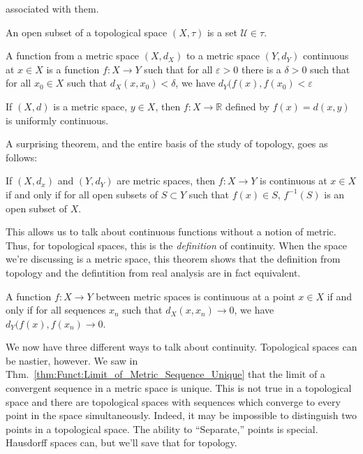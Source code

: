 \documentclass[crop=false,class=book,oneside]{standalone}
\begin{document}
            associated with them.
            \begin{definition}
                An open subset of a topological space
                $(X,\tau)$ is a set $\mathcal{U}\in\tau$.
            \end{definition}
            \begin{definition}
                A function from a metric space
                $(X,d_{X})$ to a metric space $(Y,d_{Y})$
                continuous at $x\in{X}$ is a function
                $f:X\rightarrow{Y}$ such that
                for all $\varepsilon>0$ there is
                a $\delta>0$ such that for all
                $x_{0}\in{X}$ such that
                $d_{X}(x,x_{0})<\delta$, we have
                $d_{Y}(f(x),f(x_{0})<\varepsilon$
            \end{definition}
            \begin{theorem}
                If $(X,d)$ is a metric space,
                $y\in{X}$, then
                $f:X\rightarrow\mathbb{R}$ defined by
                $f(x)=d(x,y)$ is uniformly continuous.
            \end{theorem}
            A surprising theorem, and the entire
            basis of the study of topology, goes as
            follows:
            \begin{theorem}
                If $(X,d_{x})$ and $(Y,d_{Y})$
                are metric spaces, then
                $f:X\rightarrow{Y}$ is continuous
                at $x\in{X}$ if and only if
                for all open subsets
                of $S\subset{Y}$ such that
                $f(x)\in{S}$, $f^{-1}(S)$ is an
                open subset of $X$.
            \end{theorem}
            This allows us to talk about continuous
            functions without a notion of metric.
            Thus, for topological spaces, this is
            the \textit{definition} of continuity.
            When the space we're discussing is a
            metric space, this theorem shows that the
            definition from topology and the defintition
            from real analysis are in fact equivalent.
            \begin{theorem}
                A function $f:X\rightarrow{Y}$ between
                metric spaces is continuous at a point
                $x\in{X}$ if and only if for all
                sequences $x_{n}$ such that
                $d_{X}(x,x_{n})\rightarrow{0}$, we have
                $d_{Y}(f(x),f(x_{n})\rightarrow{0}$.
            \end{theorem}
            We now have three different ways to talk
            about continuity. Topological spaces can be
            nastier, however. We saw in
            Thm.~\ref{thm:Funct:Limit_of_Metric_Sequence_Unique}
            that the limit of a convergent sequence in a
            metric space is unique.
            This is not true in a topological space and there
            are topological spaces with sequences
            which converge to every point in the
            space simultaneously. Indeed, it may be impossible
            to distinguish two points in a topological
            space. The ability to
            ``Separate,'' points is special.
            Hausdorff spaces can, but
            we'll save that for topology.
\end{document}
